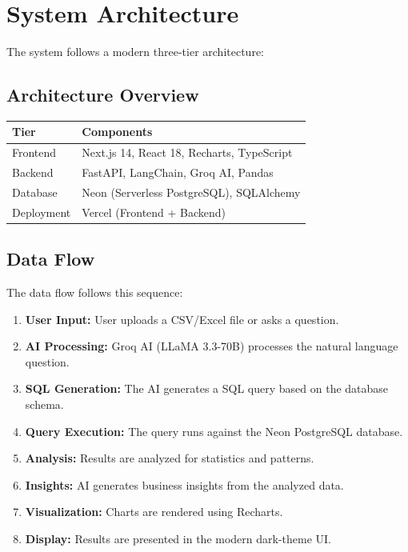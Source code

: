 \documentclass[12pt,a4paper]{article}
\begin{document}
\section{System Architecture}

The system follows a modern three-tier architecture:

\subsection{Architecture Overview}

\begin{tabular}{lp{10cm}}
\toprule
\textbf{Tier} & \textbf{Components} \\
\midrule
Frontend & Next.js 14, React 18, Recharts, TypeScript \\
Backend & FastAPI, LangChain, Groq AI, Pandas \\
Database & Neon (Serverless PostgreSQL), SQLAlchemy \\
Deployment & Vercel (Frontend + Backend) \\
\bottomrule
\end{tabular}

\subsection{Data Flow}

The data flow follows this sequence:

\begin{enumerate}
    \item \textbf{User Input:} User uploads a CSV/Excel file or asks a question.
    \item \textbf{AI Processing:} Groq AI (LLaMA 3.3-70B) processes the natural language question.
    \item \textbf{SQL Generation:} The AI generates a SQL query based on the database schema.
    \item \textbf{Query Execution:} The query runs against the Neon PostgreSQL database.
    \item \textbf{Analysis:} Results are analyzed for statistics and patterns.
    \item \textbf{Insights:} AI generates business insights from the analyzed data.
    \item \textbf{Visualization:} Charts are rendered using Recharts.
    \item \textbf{Display:} Results are presented in the modern dark-theme UI.
\end{enumerate}
\end{document}

